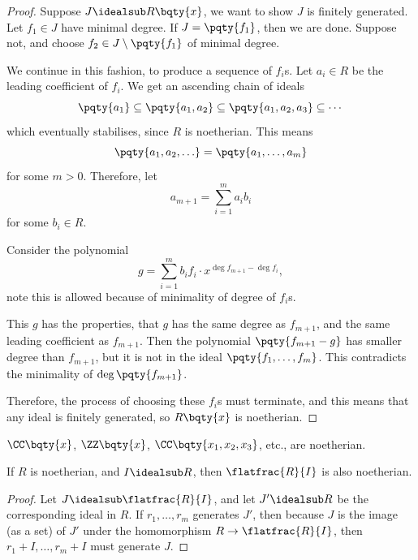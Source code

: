 \begin{proof}
    Suppose \(J \idealsub R\bqty{x}\), we want to show \(J\) is finitely generated. Let \(f_1 \in J\) have minimal degree. If \(J = \pqty{f_1}\), then we are done. Suppose not, and choose \(f_2 \in J \setminus \pqty{f_1}\) of minimal degree.

    We continue in this fashion, to produce a sequence of \(f_i\)s. Let \(a_i \in R\) be the leading coefficient of \(f_i\). We get an ascending chain of ideals
    \[
        \pqty{a_1} \subseteq \pqty{a_1, a_2} \subseteq \pqty{a_1, a_2, a_3} \subseteq \cdots
    \]
    which eventually stabilises, since \(R\) is noetherian. This means
    \[
        \pqty{a_1, a_2, \ldots} = \pqty{a_1, \ldots, a_m}
    \]
    for some \(m > 0\). Therefore, let
    \[
        a_{m + 1} = \sum_{i = 1}^{m} a_i b_i
    \]
    for some \(b_i \in R\).

    Consider the polynomial
    \[
        g = \sum_{i = 1}^{m} b_i f_i \cdot x^{\deg f_{m + 1} - \deg f_i},
    \]
    note this is allowed because of minimality of degree of \(f_i\)s.

    This \(g\) has the properties, that \(g\) has the same degree as \(f_{m + 1}\), and the same leading coefficient as \(f_{m + 1}\). Then the polynomial \(\pqty{f_{m + 1} - g}\) has smaller degree than \(f_{m + 1}\), but it is not in the ideal \(\pqty{f_1, \ldots, f_m}\). This contradicts the minimality of \(\deg\pqty{f_{m + 1}}\).

    Therefore, the process of choosing these \(f_i\)s must terminate, and this means that any ideal is finitely generated, so \(R\bqty{x}\) is noetherian.
\end{proof}

\begin{examples}
    \label{ex:noetherian-rings}%
    \(\CC\bqty{x}\), \(\ZZ\bqty{x}\), \(\CC\bqty{x_1, x_2, x_3}\), etc., are noetherian.
\end{examples}

\begin{proposition}
    \label{prop:quotient-noetherian-by-ideal-noetherian}%
    If \(R\) is noetherian, and \(I \idealsub R\), then \(\flatfrac{R}{I}\) is also noetherian.
\end{proposition}

\begin{proof}
    Let \(J \idealsub \flatfrac{R}{I}\), and let \(J' \idealsub R\) be the corresponding ideal in \(R\). If \(r_1, \ldots, r_m\) generates \(J'\), then because \(J\) is the image (as a set) of \(J'\) under the homomorphism \(R \to \flatfrac{R}{I}\), then \(r_1 + I, \ldots, r_m + I\) must generate \(J\).
\end{proof}

